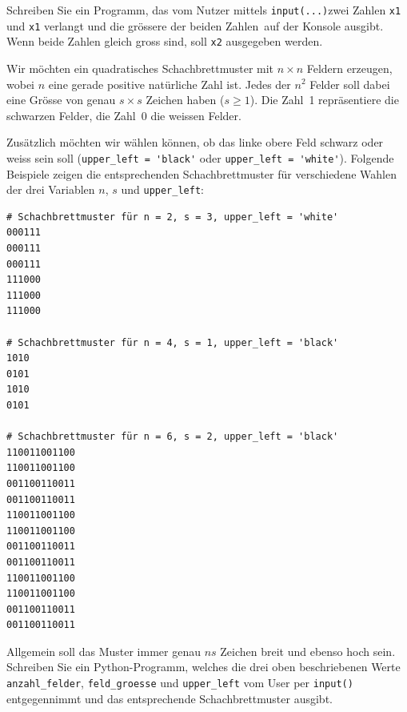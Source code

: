 \begin{myexercise}
	Schreiben Sie ein Programm, das vom Nutzer mittels \lstinline|input(...)|zwei Zahlen \lstinline|x1| und \lstinline|x1| verlangt und die grössere der beiden Zahlen auf der Konsole ausgibt. Wenn beide Zahlen gleich gross sind, soll \lstinline|x2| ausgegeben werden.

	\begin{myanswer}
		
	\end{myanswer}
\end{myexercise}

\begin{mychallenge}


	Wir möchten ein quadratisches Schachbrettmuster mit $n \times n$ Feldern erzeugen, wobei $n$ eine gerade positive natürliche Zahl ist. Jedes der $n^2$ Felder soll dabei eine Grösse von genau $s \times s$ Zeichen haben ($s \geq 1$). Die Zahl~1 repräsentiere die schwarzen Felder, die Zahl~0 die weissen Felder.

	Zusätzlich möchten wir wählen können, ob das linke obere Feld schwarz oder weiss sein soll (\lstinline|upper_left = 'black'| oder \lstinline|upper_left = 'white'|). Folgende Beispiele zeigen die entsprechenden Schachbrettmuster für verschiedene Wahlen der drei Variablen $n$, $s$ und \lstinline|upper_left|:

	\begin{verbatim}
# Schachbrettmuster für n = 2, s = 3, upper_left = 'white'
000111
000111
000111
111000
111000
111000

# Schachbrettmuster für n = 4, s = 1, upper_left = 'black'
1010
0101
1010
0101

# Schachbrettmuster für n = 6, s = 2, upper_left = 'black'
110011001100
110011001100
001100110011
001100110011
110011001100
110011001100
001100110011
001100110011
110011001100
110011001100
001100110011
001100110011
\end{verbatim}

	Allgemein soll das Muster immer genau $ns$ Zeichen breit und ebenso hoch sein. Schreiben Sie ein Python-Programm, welches die drei oben beschriebenen Werte \lstinline|anzahl_felder|, \lstinline|feld_groesse| und \lstinline|upper_left| vom User per \lstinline|input()| entgegennimmt und das entsprechende Schachbrettmuster ausgibt.
	\begin{myanswer}
		
	\end{myanswer}
\end{mychallenge}
\newpage

